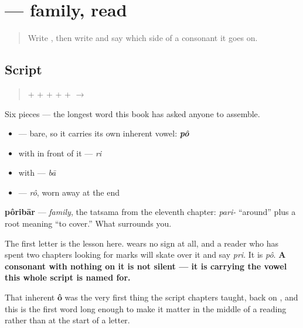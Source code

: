\section[pôribār]{ — family, read}

\label{lesson:BN-W04-poribar-read}



\begin{quote}
Write \textbf{}, then write \textbf{} and say which side of a consonant it goes on.
\end{quote}

\subsection*{Script}
\begin{quote}
\textbf{} + \textbf{} + \textbf{} + \textbf{} + \textbf{} + \textbf{} $\to$ \textbf{}
\end{quote}

Six pieces — the longest word this book has asked anyone to assemble.

\begin{itemize}
\raggedright
  \item \textbf{} — bare, so it carries its own inherent vowel: \emph{\textbf{pô}}
  \item \textbf{} with \textbf{} in front of it — \emph{ri}
  \item \textbf{} with \textbf{} — \emph{bā}
  \item \textbf{} — \emph{rô}, worn away at the end
\end{itemize}

\textbf{pôribār} — \emph{family}, the tatsama from the eleventh chapter: \emph{pari-} \textquotedblleft{}around\textquotedblright{} plus a root meaning \textquotedblleft{}to cover.\textquotedblright{} What surrounds you.

The first letter is the lesson here. \textbf{} wears no sign at all, and a reader who has spent two chapters looking for marks will skate over it and say \emph{pri}. It is \emph{pô}. \textbf{A consonant with nothing on it is not silent — it is carrying the vowel this whole script is named for.}

That inherent \textbf{ô} was the very first thing the script chapters taught, back on \textbf{}, and this is the first word long enough to make it matter in the middle of a reading rather than at the start of a letter.

